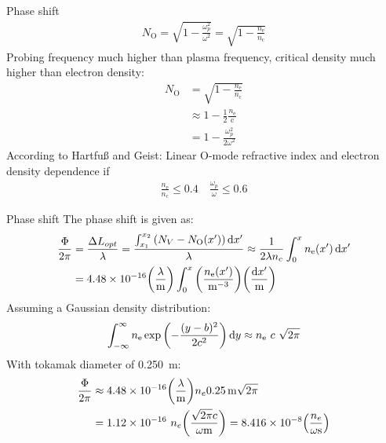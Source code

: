 \documentclass[hyperref={colorlinks=true,urlcolor=blue,linkcolor=.},aspectratio=1610,mathserif]{beamer}
\begin{document}
\begin{frame}{Phase shift}
	\centering
	\begin{align}
		N_\mathrm{O} = \sqrt{1-\frac{\omega_p^2}{\omega^2}} = \sqrt{1-\frac{n_\mathrm{e}}{n_\mathrm{c}}}
	\end{align}
	Probing frequency much higher than plasma frequency, critical density much higher than electron density:
	\begin{align}
		N_\mathrm{O} & = \sqrt{1-\frac{n_\mathrm{e}}{n_\mathrm{c}}}         \\
		             & \approx 1-\frac{1}{2}\frac{n_\mathrm{e}}{\mathrm{c}} \\
		             & = 1-\frac{\omega_p^2}{2\omega^2}
	\end{align}
	According to Hartfuß and Geist:
	Linear O-mode refractive index and electron density dependence if
	\begin{align}
		\frac{n_\mathrm{e}}{n_\mathrm{c}} \leq0.4 \quad \frac{\omega_p}{\omega}           \leq0.6
	\end{align}
\end{frame}

\begin{frame}{Phase shift}
	The phase shift is given as:
	\begin{align}
		\frac{\Phi}{2\pi} & = \frac{\Delta L_{opt}}{\lambda} = \frac{\int_{x_1}^{x_2}\pqty{N_V-N_{\mathrm{O}}(x')}\dd{x'}}{\lambda} \approx \frac{1}{2\lambda n_c}\int_{0}^{x}n_\mathrm{e}(x')\dd{x'} \nonumber \\
		                  & = 4.48\times 10^{-16} \pqty{\frac{\lambda}{\si{\meter}}}\int_{0}^{x}\pqty{\frac{n_\mathrm{e}(x')}{\si{\per\meter\cubed}}}\pqty{\frac{\dd{x'}}{\si{\meter}}}
	\end{align}
	Assuming a Gaussian density distribution:
	\begin{align}
		\int_{-\infty}^{\infty}n_\mathrm{e} \exp\pqty{-\frac{(y-b)^2}{2c^2}}\dd{y} \approx n_\mathrm{e}\ c\ \sqrt{2\pi}
	\end{align}
	With tokamak diameter of \SI{0.250}{\meter}:
	\begin{align}
		\frac{\Phi}{2\pi} & \approx 4.48\times 10^{-16}\pqty{\frac{\lambda}{\si{\meter}}}n_e\SI{0.25}{\meter}\sqrt{2\pi}                                          \\
		                  & = 1.12\times 10^{-16}\ n_e  \pqty{\frac{\sqrt{2\pi} c}{\omega\si{\meter}}} = 8.416\times 10^{-8}\pqty{\frac{n_e}{\omega\si{\second}}}
	\end{align}
\end{frame}
\end{document}

